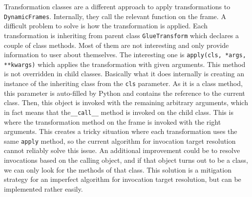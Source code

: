 Transformation classes are a different approach to apply transformations to \texttt{DynamicFrames}. Internally, they call the relevant function on the frame. A difficult problem to solve is how the transformation is applied. Each transformation is inheriting from parent class \texttt{GlueTransform} which declares a couple of class methods. Most of them are not interesting and only provide information to user about themselves. The interesting one is \texttt{apply(cls, *args, **kwargs)} which applies the transformation with given arguments. This method is not overridden in child classes. Basically what it does internally is creating an instance of the inheriting class from the \texttt{cls} parameter. As it is a class method, this parameter is auto-filled by Python and contains the reference to the current class. Then, this object is invoked with the remaining arbitrary arguments, which in fact means that the\texttt{\_\_call\_\_} method is invoked on the child class. This is where the transformation method on the frame is invoked with the right arguments. This creates a tricky situation where each transformation uses the same \texttt{apply} method, so the current algorithm for invocation target resolution cannot reliably solve this issue. An additional improvement could be to resolve invocations based on the calling object, and if that object turns out to be a class, we can only look for the methods of that class. This solution is a mitigation strategy for an imperfect algorithm for invocation target resolution, but can be implemented rather easily.

